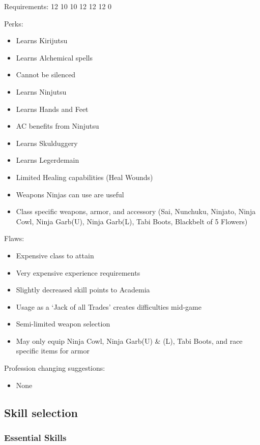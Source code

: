 \documentclass[12pt]{article}
\providecommand{\tightlist}{%
  \setlength{\itemsep}{0pt}\setlength{\parskip}{0pt}}
\begin{document}
Requirements: 12 10 10 12 12 12 0

Perks:

\begin{itemize}
\item
  Learns Kirijutsu
\item
  Learns Alchemical spells
\item
  Cannot be silenced
\item
  Learns Ninjutsu
\item
  Learns Hands and Feet
\item
  AC benefits from Ninjutsu
\item
  Learns Skulduggery
\item
  Learns Legerdemain
\item
  Limited Healing capabilities (Heal Wounds)
\item
  Weapons Ninjas can use are useful
\item
  Class specific weapons, armor, and accessory (Sai, Nunchuku, Ninjato,
  Ninja Cowl, Ninja Garb(U), Ninja Garb(L), Tabi Boots, Blackbelt of 5
  Flowers)
\end{itemize}

Flaws:

\begin{itemize}
\item
  Expensive class to attain
\item
  Very expensive experience requirements
\item
  Slightly decreased skill points to Academia
\item
  Usage as a `Jack of all Trades' creates difficulties mid-game
\item
  Semi-limited weapon selection
\item
  May only equip Ninja Cowl, Ninja Garb(U) \& (L), Tabi Boots, and race
  specific items for armor
\end{itemize}

Profession changing suggestions:

\begin{itemize}
\tightlist
\item
  None
\end{itemize}

\subsection{Skill selection}\label{skill-selection}

\subsubsection{Essential Skills}\label{essential-skills}
\end{document}
